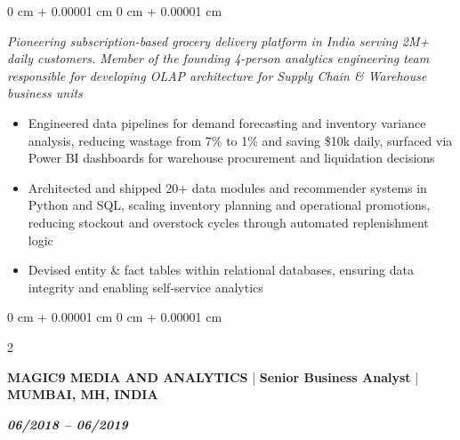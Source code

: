 \documentclass[10pt, letterpaper]{article}
\newenvironment{highlights}{
    \begin{itemize}[
        topsep=0.10 cm,
        parsep=0.10 cm,
        partopsep=0pt,
        itemsep=0pt,
        leftmargin=0 cm + 10pt
    ]
}{
    \end{itemize}
} %
\newenvironment{onecolentry}{
    \begin{adjustwidth}{
        0 cm + 0.00001 cm
    }{
        0 cm + 0.00001 cm
    }
}{
    \end{adjustwidth}
} %
\newenvironment{twocolentry}[2][]{
    \onecolentry
    \def\secondColumn{#2}
    \setcolumnwidth{\fill, 4.5 cm}
    \begin{paracol}{2}
}{
    \switchcolumn \raggedleft \secondColumn
    \end{paracol}
    \endonecolentry
} %
\begin{document}
\vspace{0.10 cm}

\begin{onecolentry}
    \textit{Pioneering subscription-based grocery delivery platform in India serving 2M+ daily customers. Member of the founding 4-person analytics engineering team responsible for developing OLAP architecture for Supply Chain \& Warehouse business units}

     \begin{highlights}


                \item Engineered data pipelines for demand forecasting and inventory variance analysis, reducing wastage from 7\% to 1\% and saving \$10k daily, surfaced via Power BI dashboards for warehouse procurement and liquidation decisions

                \item Architected and shipped 20+ data modules and recommender systems in Python and SQL, scaling inventory planning and operational promotions, reducing stockout and overstock cycles through automated replenishment logic

                \item Devised entity \& fact tables within relational databases, ensuring data integrity and enabling self-service analytics
     \end{highlights}
     
\end{onecolentry}
\vspace{0.10 cm}
\begin{twocolentry}{\textbf{\textit{06/2018 – 06/2019}}}
    \textbf{MAGIC9 MEDIA AND ANALYTICS} | \textbf{Senior Business Analyst} | \textbf{MUMBAI, MH, INDIA} 
    
\end{twocolentry}

\vspace{0.10 cm}
\end{document}
